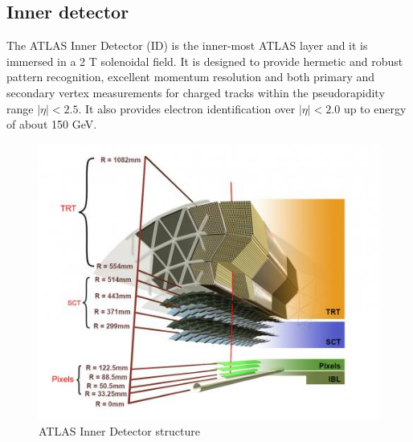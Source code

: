 \documentclass[a4paper, oneside, 11pt, openright]{book}
\begin{document}
				\subsection{Inner detector}
					The ATLAS Inner Detector (ID) is the inner-most ATLAS layer and it is immersed in a 2 T solenoidal field. It is designed to provide hermetic and robust pattern recognition, excellent momentum resolution and both primary and secondary vertex measurements for charged tracks within the pseudorapidity range $|\eta|<2.5$. It also provides electron identification over $|\eta|<2.0$ up to energy of about 150 GeV. 
					\begin{figure}[H]
						\centering
						\includegraphics[width=0.45\textheight]{tesi_images/ID_structure.jpg}
						\caption{ATLAS Inner Detector structure}
					\end{figure}
					
\end{document}
